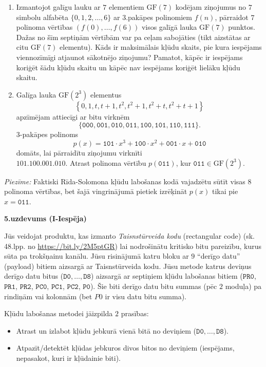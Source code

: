 \documentclass[a4paper,12pt]{article}
\begin{document}
\begin{enumerate}
\item Izmantojot galīgu lauku ar $7$ elementiem 
$\text{GF}(7)$ kodējam ziņojumus no
$7$ simbolu alfabēta $\{ 0,1,2,\ldots,6 \}$ ar 3.pakāpes polinomiem $f(n)$,
pārraidot $7$ polinoma vērtības $(f(0),\ldots,f(6))$ visos
galīgā lauka $\text{GF}(7)$ punktos.
Dažas no šīm septiņām vērtībām var pa ceļam sabojāties 
(tikt aizstātas ar citu $\text{GF}(7)$ elementu).
Kāds ir maksimālais kļūdu skaits, pie kura iespējams
viennozīmīgi atjaunot sākotnējo ziņojumu?
Pamatot, kā\-pēc ir iespējams koriģēt šādu kļūdu skaitu un kāpēc nav
iespējams koriģēt lielāku kļūdu skaitu.
\item Galīga lauka $\text{GF}(2^3)$ elementus
$$\left\{ 0,1,t,t+1,t^2,t^2+1,t^2+t,t^2+t+1 \right\}$$
apzīmējam attiecīgi ar bitu virknēm 
$$\{\mathtt{000},\mathtt{001},\mathtt{010},\mathtt{011},
\mathtt{100},\mathtt{101},\mathtt{110},\mathtt{111}\}.$$
$3$-pakāpes polinoms 
$$p(x) = \mathtt{101}\cdot{}x^3 + \mathtt{100}\cdot{}x^2 + \mathtt{001}\cdot{}x + \mathtt{010}$$
domāts, lai pārraidītu ziņojumu virknīti\\ $\mathtt{101.100.001.010}$.
Atrast polinoma vērtību $p(\mathtt{011})$, kur $\mathtt{011}\in\text{GF}(2^3)$.\\
\end{enumerate}

{\em Piezīme:} Faktiski Rīda-Solomona kļūdu la\-bo\-ša\-nas kodā vajadzētu sūtīt
visas $8$ polinoma vērtības, bet šajā vingrinājumā pietiek izrēķināt $p(x)$ tikai pie $x=\mathtt{011}$.



\vspace{20pt}
{\bf 5.uzdevums (I-Iespēja)}

Jūs veidojat produktu, kas izmanto {\em Taisnstūrveida kodu} 
(rectangular code) (sk. 48.lpp. no \url{https://bit.ly/2M5ptGR})
lai nodrošinātu kritisko bitu pareizību, kurus sūta pa trokšņainu kanālu.
Jūsu risinājumā katru bloku ar $9$ ``derīgo datu'' (payload) bitiem
aizsargā ar Taisnstūrveida kodu.
Jūsu metode katrus
deviņus derīgo datu bitus ($\mathtt{D0},\ldots,\mathtt{D8}$)
aizsargā ar septiņiem kļūdu labošanas bitiem 
($\mathtt{PR0}$, $\mathtt{PR1}$, $\mathtt{PR2}$, $\mathtt{PC0}$, 
$\mathtt{PC1}$, $\mathtt{PC2}$, $\mathtt{P0}$).
Šie biti derīgo datu bitu summas (pēc $2$ moduļa) 
pa rindiņām vai kolonnām (bet $P0$ ir visu 
datu bitu summa). 

Kļūdu labošanas metodei jāizpilda $2$ prasības:
\begin{itemize}
\item Atrast un izlabot kļūdu jebkurā vienā bitā no deviņiem 
($\mathtt{D0},\ldots,\mathtt{D8}$).
\item Atpazīt/detektēt kļūdas jebkuros divos bitos no deviņiem 
(iespējams, nepasakot, kuri ir kļūdainie biti).
\end{itemize}
\end{document}
